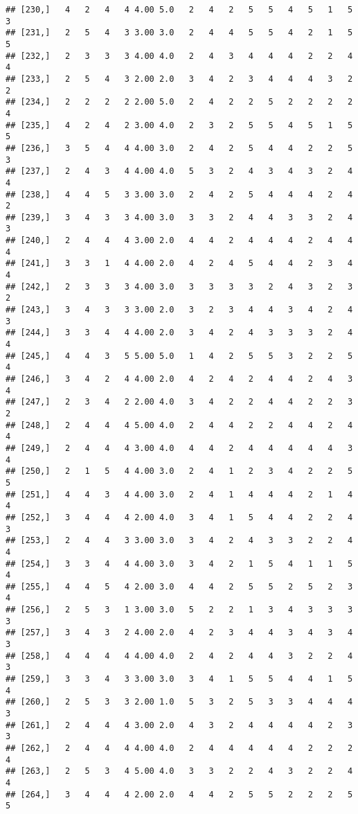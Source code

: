 \documentclass[]{article}
\begin{document}
\begin{verbatim}
## [230,]   4   2   4   4 4.00 5.0   2   4   2   5   5   4   5   1   5   3
## [231,]   2   5   4   3 3.00 3.0   2   4   4   5   5   4   2   1   5   5
## [232,]   2   3   3   3 4.00 4.0   2   4   3   4   4   4   2   2   4   4
## [233,]   2   5   4   3 2.00 2.0   3   4   2   3   4   4   4   3   2   2
## [234,]   2   2   2   2 2.00 5.0   2   4   2   2   5   2   2   2   2   4
## [235,]   4   2   4   2 3.00 4.0   2   3   2   5   5   4   5   1   5   5
## [236,]   3   5   4   4 4.00 3.0   2   4   2   5   4   4   2   2   5   3
## [237,]   2   4   3   4 4.00 4.0   5   3   2   4   3   4   3   2   4   4
## [238,]   4   4   5   3 3.00 3.0   2   4   2   5   4   4   4   2   4   2
## [239,]   3   4   3   3 4.00 3.0   3   3   2   4   4   3   3   2   4   3
## [240,]   2   4   4   4 3.00 2.0   4   4   2   4   4   4   2   4   4   4
## [241,]   3   3   1   4 4.00 2.0   4   2   4   5   4   4   2   3   4   4
## [242,]   2   3   3   3 4.00 3.0   3   3   3   3   2   4   3   2   3   2
## [243,]   3   4   3   3 3.00 2.0   3   2   3   4   4   3   4   2   4   3
## [244,]   3   3   4   4 4.00 2.0   3   4   2   4   3   3   3   2   4   4
## [245,]   4   4   3   5 5.00 5.0   1   4   2   5   5   3   2   2   5   4
## [246,]   3   4   2   4 4.00 2.0   4   2   4   2   4   4   2   4   3   4
## [247,]   2   3   4   2 2.00 4.0   3   4   2   2   4   4   2   2   3   2
## [248,]   2   4   4   4 5.00 4.0   2   4   4   2   2   4   4   2   4   4
## [249,]   2   4   4   4 3.00 4.0   4   4   2   4   4   4   4   4   3   4
## [250,]   2   1   5   4 4.00 3.0   2   4   1   2   3   4   2   2   5   5
## [251,]   4   4   3   4 4.00 3.0   2   4   1   4   4   4   2   1   4   4
## [252,]   3   4   4   4 2.00 4.0   3   4   1   5   4   4   2   2   4   3
## [253,]   2   4   4   3 3.00 3.0   3   4   2   4   3   3   2   2   4   4
## [254,]   3   3   4   4 4.00 3.0   3   4   2   1   5   4   1   1   5   4
## [255,]   4   4   5   4 2.00 3.0   4   4   2   5   5   2   5   2   3   4
## [256,]   2   5   3   1 3.00 3.0   5   2   2   1   3   4   3   3   3   3
## [257,]   3   4   3   2 4.00 2.0   4   2   3   4   4   3   4   3   4   3
## [258,]   4   4   4   4 4.00 4.0   2   4   2   4   4   3   2   2   4   3
## [259,]   3   3   4   3 3.00 3.0   3   4   1   5   5   4   4   1   5   4
## [260,]   2   5   3   3 2.00 1.0   5   3   2   5   3   3   4   4   4   3
## [261,]   2   4   4   4 3.00 2.0   4   3   2   4   4   4   4   2   3   3
## [262,]   2   4   4   4 4.00 4.0   2   4   4   4   4   4   2   2   2   4
## [263,]   2   5   3   4 5.00 4.0   3   3   2   2   4   3   2   2   4   4
## [264,]   3   4   4   4 2.00 2.0   4   4   2   5   5   2   2   2   5   5

\end{verbatim}
\end{document}
